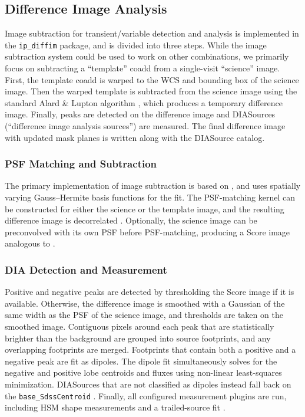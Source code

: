 \subsection{Difference Image Analysis}
\label{sec:dia}

Image subtraction for transient/variable detection and analysis is implemented in the \texttt{ip\_diffim} package, and is divided into three steps.
While the image subtraction system could be used to work on other combinations, we primarily focus on subtracting a ``template'' coadd from a single-visit ``science'' image.
First, the template coadd is warped to the WCS and bounding box of the science image.
Then the warped template is subtracted from the science image using the standard Alard \& Lupton algorithm \citep{1998ApJ...503..325A}, which produces a temporary difference image.
Finally, peaks are detected on the difference image and DIASources (``difference image analysis sources'') are measured.
The final difference image with updated mask planes is written along with the DIASource catalog.

\subsubsection{PSF Matching and Subtraction}

The primary implementation of image subtraction is based on \citet{1998ApJ...503..325A}, and uses spatially varying Gauss--Hermite basis functions for the fit.
The PSF-matching kernel can be constructed for either the science or the template image, and the resulting difference image is decorrelated \citep{DMTN-021}.
Optionally, the science image can be preconvolved with its own PSF before PSF-matching, producing a Score image analogous to \citet{2016ApJ...830...27Z}.

\subsubsection{DIA Detection and Measurement}
\label{sec:detectAndMeasureDiaSource}

Positive and negative peaks are detected by thresholding the Score image if it is available.
Otherwise, the difference image is smoothed with a Gaussian of the same width as the PSF of the science image, and thresholds are taken on the smoothed image.
Contiguous pixels around each peak that are statistically brighter than the background are grouped into source footprints, and any overlapping footprints are merged.
Footprints that contain both a positive and a negative peak are fit as dipoles.
The dipole fit simultaneously solves for the negative and positive lobe centroids and fluxes using non-linear least-squares minimization.
DIASources that are not classified as dipoles instead fall back on the \texttt{base\_SdssCentroid} .
Finally, all configured measurement plugins are run, including HSM shape measurements  and a trailed-source fit .


